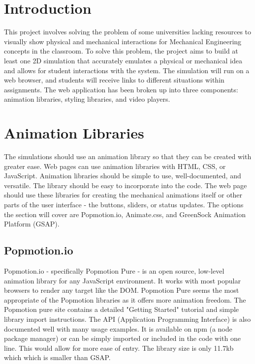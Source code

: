 \documentclass[capstone.tex]{subfiles}
\begin{document}
\section{Introduction}
This project involves solving the problem of some universities lacking resources to visually show physical and mechanical interactions for Mechanical Engineering concepts in the classroom. 
To solve this problem, the project aims to build at least one 2D simulation that accurately emulates a physical or mechanical idea and allows for student interactions with the system. 
The simulation will run on a web browser, and students will receive links to different situations within assignments. The web application has been broken up into three components: animation libraries, styling libraries, and video players.  

\section{Animation Libraries}
The simulations should use an animation library so that they can be created with greater ease. Web pages can use animation libraries with HTML, CSS, or JavaScript. Animation libraries should be simple to use, well-documented, and versatile. The library should be easy to incorporate into the code.  The web page should use these libraries for creating the mechanical animations itself or other parts of the user interface - the buttons, sliders, or status updates. The options the section will cover are Popmotion.io, Animate.css, and GreenSock Animation Platform (GSAP).

\subsection{Popmotion.io}
Popmotion.io - specifically Popmotion Pure - is an open source, low-level animation library for any JavaScript environment. It works with most popular browsers to render any target like the DOM. 
Popmotion Pure seems the most appropriate of the Popmotion libraries as it offers more animation freedom. The Popmotion pure site contains a detailed "Getting Started" tutorial and simple library import instructions. The API (Application Programming Interface) is also documented well with many usage examples. It is available on npm (a node package manager) or can be simply imported or included in the code with one line. This would allow for more ease of entry. The library size is only 11.7kb which which is smaller than GSAP. 
\end{document}
